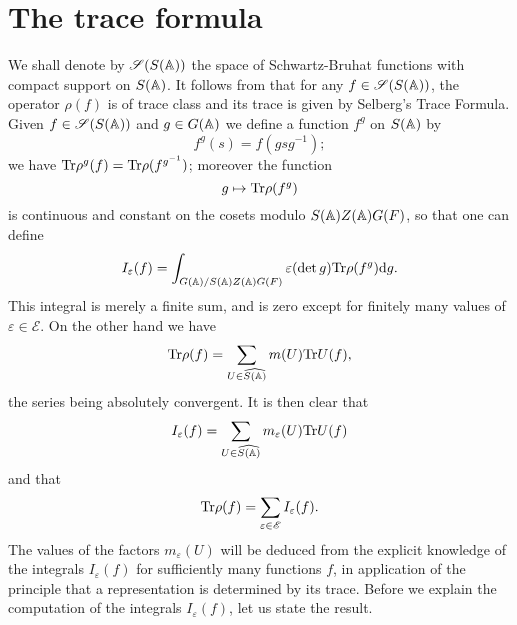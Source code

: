\section{The trace formula}
\label{sec:traceformula}

We shall denote by $\mathscr{S}(S(\mathbb{A}))$ the space of Schwartz-Bruhat functions with compact support on $S(\mathbb{A})$.
It follows from \cite{duflo1971formule} that for any $f \in \mathscr{S}(S(\mathbb{A}))$, the operator $\rho(f)$ is of trace class and its trace is given by Selberg's Trace Formula.
Given $f \in \mathscr{S}(S(\mathbb{A}))$ and $g \in G(\mathbb{A})$ we define a function $f^g$ on $S(\mathbb{A})$ by
\[
    f^g(s) = f(g s g^{-1});
\]
we have $\mathrm{Tr} \rho^g(f) = \mathrm{Tr} \rho(f^{g^{-1}})$; moreover the function
\[
    g \mapsto \mathrm{Tr} \rho(f^{g})
\]
is continuous and constant on the cosets modulo $S(\mathbb{A})Z(\mathbb{A})G(F)$, so that one can define
\[
    I_\varepsilon(f) = \int_{G(\mathbb{A}) / S(\mathbb{A}) Z(\mathbb{A}) G(F)} \varepsilon(\det g) \mathrm{Tr} \rho(f^g) \mathrm{d} g.
\]
This integral is merely a finite sum, and is zero except for finitely many values of $\varepsilon \in \mathscr{E}$.
On the other hand we have
\[
    \mathrm{Tr} \rho(f) = \sum_{U \in \widehat{S(\mathbb{A})}} m(U) \mathrm{Tr} U(f),
\]
the series being absolutely convergent. It is then clear that
\[
    I_\varepsilon(f) = \sum_{U \in \widehat{S(\mathbb{A})}} m_\varepsilon(U) \mathrm{Tr} U(f)
\]
and that
\[
    \mathrm{Tr} \rho(f) = \sum_{\varepsilon \in \mathscr{E}} I_\varepsilon(f).
\]
The values of the factors $m_\varepsilon(U)$ will be deduced from the explicit knowledge of the integrals $I_\varepsilon(f)$ for sufficiently many functions $f$, in application of the principle that a representation is determined by its trace.
Before we explain the computation of the integrals $I_\varepsilon(f)$, let us state the result.
